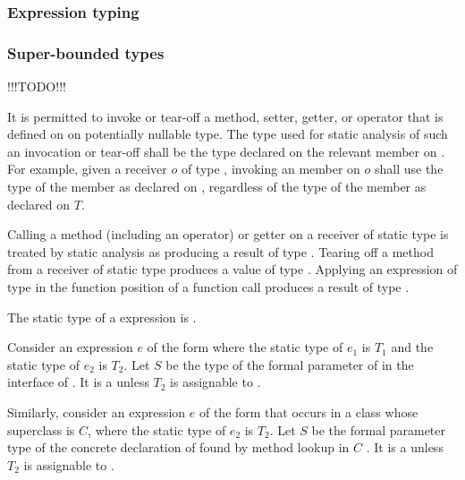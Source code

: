 \documentclass[makeidx]{article}
\begin{document}
\subsubsection{Expression typing}
\subsubsection{Super-bounded types}

!!!TODO!!!

It is permitted to invoke or tear-off a method, setter, getter, or operator that
is defined on  on potentially nullable type.  The type used for static
analysis of such an invocation or tear-off shall be the type declared on the
relevant member on .  For example, given a receiver $o$ of type ,
invoking an  member on $o$ shall use the type of the member as declared
on , regardless of the type of the member as declared on $T$.



Calling a method (including an operator) or getter on a receiver of static type
 is treated by static analysis as producing a result of type .
Tearing off a method from a receiver of static type  produces a value of
type .  Applying an expression of type  in the function position
of a function call produces a result of type .

The static type of a  expression is .

Consider an expression $e$ of the form  where the static type of
$e_1$ is $T_1$ and the static type of $e_2$ is $T_2$. Let $S$ be the type of the
formal parameter of  in the interface of .
It is a  unless $T_2$ is assignable to .

Similarly, consider an expression $e$ of the form  that occurs in a
class whose superclass is $C$, where the static type of $e_2$ is $T_2$. Let $S$ be
the formal parameter type of the concrete declaration of  found by
method lookup in $C$
.
It is a  unless $T_2$ is assignable to .
\end{document}
